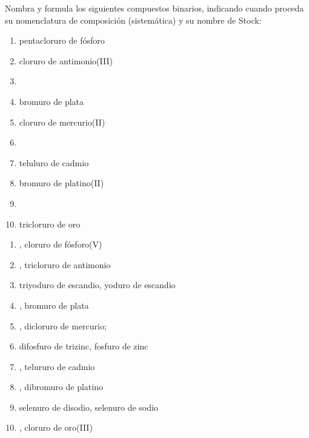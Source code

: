\begin{exercise}[
    tags    = {inorgánica,compuestos binarios,sales binarias,sales},
    topics  = {química inorgánica,formulación,nomenclatura},
    source  = {SAN Formulación, p26, e29},
  ]
  Nombra y formula los siguientes compuestos binarios, indicando cuando proceda su nomenclatura de composición (sistemática) y su nombre de Stock:

  \begin{enumerate}
    \item pentacloruro de fósforo
    \item cloruro de antimonio(III)
    \item {}
    \item bromuro de plata
    \item cloruro de mercurio(II)
    \item {}
    \item teluluro de cadmio
    \item bromuro de platino(II)
    \item {}
    \item tricloruro de oro
  \end{enumerate}
\end{exercise}

\begin{solution}
  \begin{enumerate}
    \item {}, cloruro de fósforo(V)
    \item {}, tricloruro de antimonio
    \item triyoduro de escandio, yoduro de escandio
    \item {}, bromuro de plata
    \item {}, dicloruro de mercurio;
    \item difosfuro de trizinc, fosfuro de zinc
    \item {}, telururo de cadmio
    \item {}, dibromuro de platino
    \item selenuro de disodio, selenuro de sodio
    \item {}, cloruro de oro(III)
  \end{enumerate}
\end{solution}




